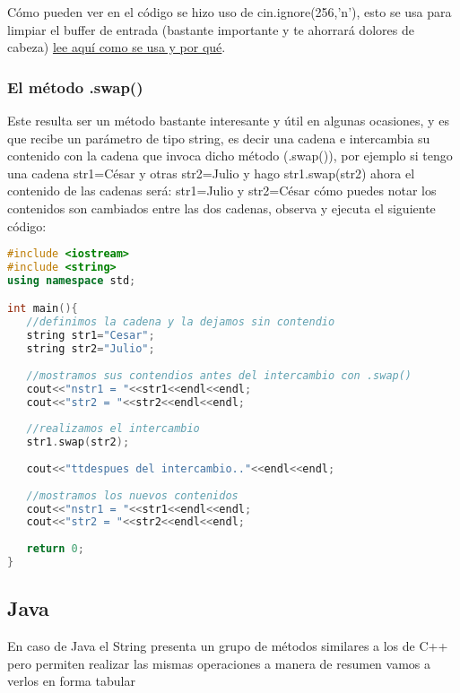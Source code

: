 Cómo pueden ver en el código se hizo uso de cin.ignore(256,’n’), esto se usa para limpiar el buffer de entrada (bastante importante y te ahorrará dolores de cabeza) \href{http://blogdelingeniero1.wordpress.com/2014/06/08/limpiar-el-buffer-de-entrada-estandar-en-c/}{lee aquí como se usa y por qué}.

\subsubsection{El método .swap()}

Este resulta ser un método bastante interesante y útil en algunas ocasiones, y es que recibe un parámetro de tipo string, es decir una cadena e intercambia su contenido con la cadena que invoca dicho método (.swap()), por ejemplo si tengo una cadena str1=César y otras str2=Julio y hago str1.swap(str2) ahora el contenido de las cadenas será: str1=Julio y str2=César cómo puedes notar los contenidos son cambiados entre las dos cadenas, observa y ejecuta el siguiente código:

\begin{lstlisting}[language=C++]
#include <iostream>
#include <string>
using namespace std;

int main(){
   //definimos la cadena y la dejamos sin contendio
   string str1="Cesar";
   string str2="Julio";
	
   //mostramos sus contendios antes del intercambio con .swap()
   cout<<"nstr1 = "<<str1<<endl<<endl;
   cout<<"str2 = "<<str2<<endl<<endl;
	
   //realizamos el intercambio
   str1.swap(str2);
	
   cout<<"ttdespues del intercambio.."<<endl<<endl;
	
   //mostramos los nuevos contenidos
   cout<<"nstr1 = "<<str1<<endl<<endl;
   cout<<"str2 = "<<str2<<endl<<endl;
	
   return 0;
}
\end{lstlisting}

\subsection{Java}
En caso de Java el String presenta un grupo de métodos similares a los de C++ pero permiten realizar las mismas operaciones a manera de resumen vamos a verlos en forma tabular

